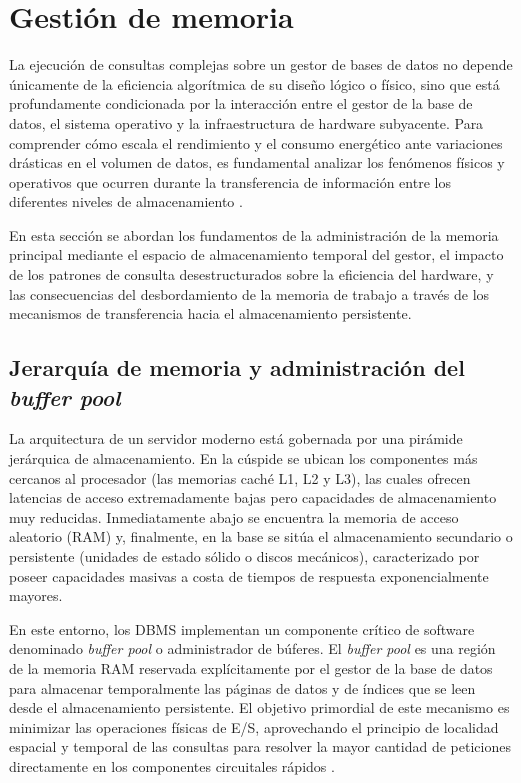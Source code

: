 \documentclass[12pt, letter paper]{report}
\begin{document}
    \section{Gestión de memoria} %
    \label{sec:gestión_de_memoria}
      La ejecución de consultas complejas sobre un gestor de bases de datos no
      depende únicamente de la eficiencia algorítmica de su diseño lógico o
      físico, sino que está profundamente condicionada por la interacción entre
      el gestor de la base de datos, el sistema operativo y la infraestructura
      de hardware subyacente. Para comprender cómo escala el rendimiento y el
      consumo energético ante variaciones drásticas en el volumen de datos, es
      fundamental analizar los fenómenos físicos y operativos que ocurren
      durante la transferencia de información entre los diferentes niveles de
      almacenamiento \cite{silberschatz2019operating}.

      En esta sección se abordan los fundamentos de la administración de la
      memoria principal mediante el espacio de almacenamiento temporal del
      gestor, el impacto de los patrones de consulta desestructurados sobre la
      eficiencia del hardware, y las consecuencias del desbordamiento de la
      memoria de trabajo a través de los mecanismos de transferencia hacia el
      almacenamiento persistente.

      \subsection{Jerarquía de memoria y administración del \textit{buffer pool}} %
      \label{sub:jerarquía_de_memoria_y_administración_del_buffer_pool}
        La arquitectura de un servidor moderno está gobernada por una pirámide
        jerárquica de almacenamiento. En la cúspide se ubican los componentes
        más cercanos al procesador (las memorias caché L1, L2 y L3), las cuales
        ofrecen latencias de acceso extremadamente bajas pero capacidades de
        almacenamiento muy reducidas. Inmediatamente abajo se encuentra la
        memoria de acceso aleatorio (RAM) y, finalmente, en la base se sitúa el
        almacenamiento secundario o persistente (unidades de estado sólido o
        discos mecánicos), caracterizado por poseer capacidades masivas a costa
        de tiempos de respuesta exponencialmente mayores.

        En este entorno, los DBMS implementan un componente crítico de software
        denominado \textit{buffer pool} o administrador de búferes. El
        \textit{buffer pool} es una región de la memoria RAM reservada
        explícitamente por el gestor de la base de datos para almacenar
        temporalmente las páginas de datos y de índices que se leen desde el
        almacenamiento persistente. El objetivo primordial de este mecanismo es
        minimizar las operaciones físicas de E/S, aprovechando el principio de
        localidad espacial y temporal de las consultas para resolver la mayor
        cantidad de peticiones directamente en los componentes circuitales
        rápidos \cite{ramakrishnan2003database}.
\end{document}
